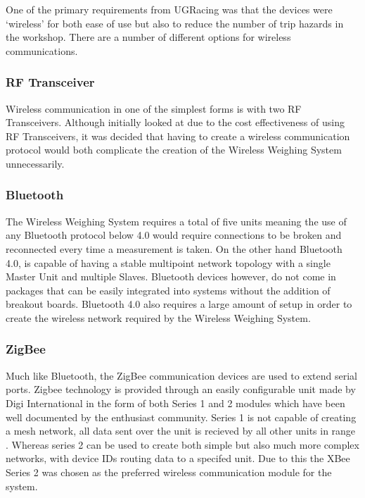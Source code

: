 One of the primary requirements from UGRacing was that the devices were `wireless' for both ease of use but also to reduce the number of trip hazards in the workshop. There are a number of different options for wireless communications.
\subsubsection{RF Transceiver}
Wireless communication in one of the simplest forms is with two RF Transceivers. Although initially looked at due to the cost effectiveness of using RF Transceivers, it was decided that having to create a wireless communication protocol would both complicate the creation of the Wireless Weighing System unnecessarily.
\subsubsection{Bluetooth}
The Wireless Weighing System requires a total of five units meaning the use of any Bluetooth \cite{bluetooth}  protocol below 4.0 would require connections to be broken and reconnected every time a measurement is taken. On the other hand Bluetooth 4.0, is capable of having a stable multipoint network topology with a single Master Unit and multiple Slaves. Bluetooth devices however, do not come in packages that can be easily integrated into systems without the addition of breakout boards. Bluetooth 4.0 also requires a large amount of setup in order to create the wireless network required by the Wireless Weighing System.
\subsubsection{ZigBee}
Much like Bluetooth, the ZigBee communication devices are used to extend serial ports. Zigbee technology is provided through an easily configurable unit made by Digi International \cite{xbee-datasheet} in the form of both Series 1 and 2 modules which have been well documented by the enthusiast community. Series 1 is not capable of creating a mesh network, all data sent over the unit is recieved by all other units in range \cite{xbee-modules-selection}. Whereas series 2 can be used to create both simple but also much more complex networks, with device IDs routing data to a specifed unit.  Due to this the XBee Series 2 was chosen as the preferred wireless communication module for the system.
